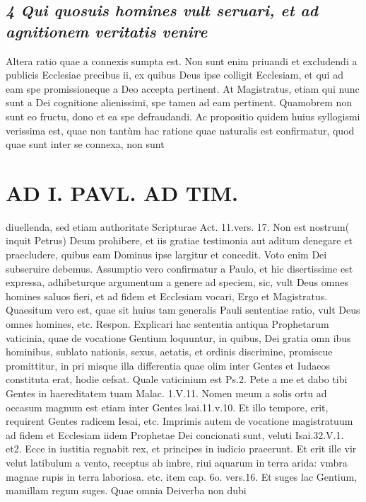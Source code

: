 \documentclass{article}
\begin{document}
\begin{pages}
\subsection*{\textit{4 Qui quosuis homines vult seruari, et ad agnitionem veritatis venire }}\pstart Altera ratio quae a connexis sumpta est. Non sunt enim priuandi et excludendi a publicis Ecclesiae precibus ii, ex quibus Deus ipse colligit Ecclesiam, et qui ad eam spe promissioneque a Deo accepta pertinent. At Magistratus, etiam qui nunc sunt a Dei cognitione alienissimi, spe tamen ad eam pertinent. Quamobrem non sunt eo fructu, dono et ea spe defraudandi. Ac propositio quidem huius syllogismi verissima est, quae non tantùm hac ratione quae naturalis est confirmatur, quod quae sunt inter se connexa, non sunt  \pend
\section*{AD I. PAVL. AD TIM. }
\marginpar{[ p.52 ]}\pstart diuellenda, sed etiam authoritate Scripturae Act. 11.vers. 17. Non est nostrum( inquit Petrus) Deum prohibere, et iis gratiae testimonia aut aditum denegare et praecludere, quibus eam Dominus ipse largitur et concedit. Voto enim Dei subseruire debemus.  \pend\pstart Assumptio vero confirmatur a Paulo, et hic disertissime est expressa, adhibeturque argumentum a genere ad speciem, sic, vult Deus omnes homines saluos fieri, et ad fidem et Ecclesiam vocari, Ergo et Magistratus.  \pend\pstart Quaesitum vero est, quae sit huius tam generalis Pauli sententiae ratio, vult Deus omnes homines, etc. Respon. Explicari hac sententia antiqua Prophetarum vaticinia, quae de vocatione Gentium loquuntur, in quibus, Dei gratia omn ibus hominibus, sublato nationis, sexus, aetatis, et ordinis discrimine, promiscue promittitur, in pri misque  illa differentia quae olim inter Gentes et Iudaeos constituta erat, hodie cefsat. Quale vaticinium est Ps.2. Pete a me et dabo tibi Gentes in haereditatem tuam Malac. 1.V.11. Nomen meum a solis ortu ad occasum magnum est etiam inter Gentes lsai.11.v.10. Et illo tempore, erit, requirent Gentes radicem Iesai, etc. Imprimis autem de vocatione magistratuum ad fidem et Ecclesiam iidem Prophetae Dei concionati sunt, veluti Isai.32.V.1. et2. Ecce in iustitia regnabit rex, et principes in iudicio praeerunt. Et erit ille vir velut latibulum a vento, receptus ab imbre, riui aquarum in terra arida: vmbra magnae rupis in terra laboriosa. etc. item cap. 6o. vers.16. Et suges lac Gentium, mamillam regum suges. Quae omnia Deiverba non dubi\pend

\end{pages}
\end{document}
